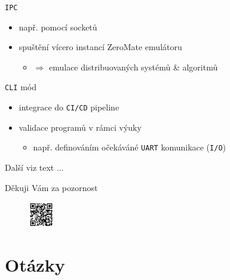 \documentclass[compress]{beamer}
\begin{document}
\begin{frame}
	\begin{block}{\texttt{IPC}}
		\begin{itemize}
			\item např. pomocí socketů
			\item spuštění vícero instancí ZeroMate emulátoru
			\begin{itemize}
				\item $\Rightarrow$ emulace distribuovaných systémů \& algoritmů
			\end{itemize}
		\end{itemize}
	\end{block}
	\begin{block}{\texttt{CLI} mód}
		\begin{itemize}
			\item integrace do \texttt{CI/CD} pipeline
			\item validace programů v rámci výuky
			\begin{itemize}
				\item např. definováním očekáváné \texttt{UART} komunikace (\texttt{I/O})
			\end{itemize}
		\end{itemize}
	\end{block}
	\noindent\makebox[\linewidth]{\rule{\textwidth}{0.4pt}}
	Další viz text \href{https://github.com/silhavyj/ZeroMate/blob/main/docs/latex/DP_silhavyj_A21N0072P.pdf}{}...
\end{frame}

\begin{frame}
  \centering \Large
  Děkuji Vám za pozornost\\
  \href{https://github.com/silhavyj/ZeroMate}{}
  \begin{figure}
  	\centering
  	\includegraphics[width=0.10\textwidth]{img/qr-code.pdf}
  \end{figure}
\end{frame}

\appendix

\section{Otázky}
\end{document}
